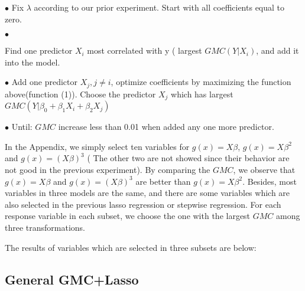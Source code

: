 \documentclass[conference,letterpaper]{IEEEtran}
\begin{document}
{$\bullet$ {\fontsize{11}{13}\selectfont Fix $\lambda$ according to our prior experiment. Start with all coefficients equal to zero. }

$\bullet$ {\fontsize{11}{13}\selectfont Find one predictor $X_i$ most correlated with y ( largest $GMC(Y|X_i)$, and add it into the model.

$\bullet$ {\fontsize{11}{13}\selectfont Add one predictor $X_j, j\neq i$, optimize coefficients by maximizing the function above(function (1)). Choose the predictor $X_j$ which has largest $GMC(Y|\beta_0+\beta_1X_i+\beta_2X_j)$ }

$\bullet$ {\fontsize{11}{13}\selectfont Until: $GMC$ increase less than 0.01 when added any one more predictor.}

In the Appendix, we simply select ten variables for $g(x)=X\beta$, $g(x)={X\beta}^2$ and  $g(x)=(X\beta)^3$ ( The other two are not showed since their behavior are not good in the previous experiment). By comparing the $GMC$, we observe that $g(x)=X\beta$ and $g(x)=(X\beta)^3$ are better than $g(x)={X\beta}^2$. Besides, most variables in  three models are the same, and there are some variables which are also selected in the previous lasso regression or stepwise regression. For each response variable in each subset, we choose the one with the largest $GMC$ among three transformations.

The results of variables which are selected in three subsets are below:}





\subsection{{\fontsize{11}{13}\selectfont General GMC+Lasso}}

}
\end{document}
